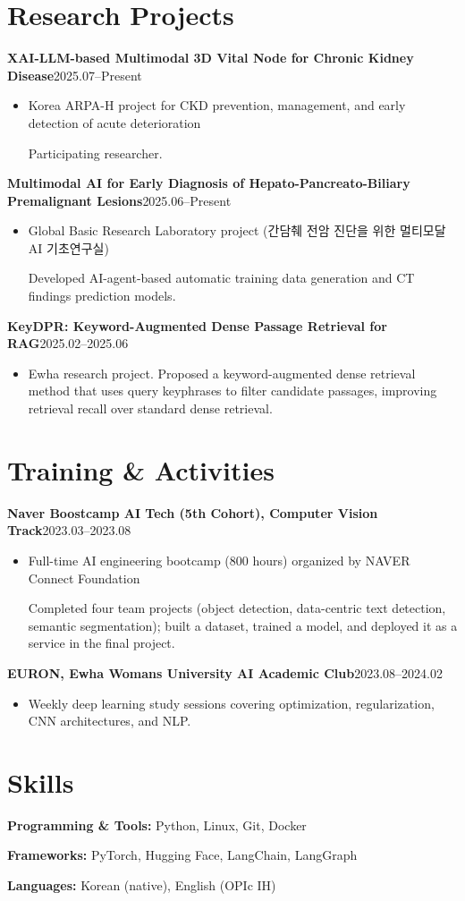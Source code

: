 \documentclass[10pt,a4paper]{article}
\newif\ifRemVS
\newcommand{\rvs}{\ifRemVS\vspace{-1.5ex}\fi\global\RemVSfalse}
\newcommand{\cventry}[3]{%
  \noindent\begin{minipage}{\linewidth}
    \rvs
    {\small\textbf{#1}\hfill #2\par}
    \begin{itemize}[topsep=2pt]\item #3\end{itemize}
  \end{minipage}\par}
\begin{document}
\section{Res\color{black}earch Projects}
\cventry{XAI-LLM-based Multimodal 3D Vital Node for Chronic Kidney Disease}{2025.07–Present}{%
  Korea ARPA-H project for CKD prevention, management, and early detection of acute deterioration\par
  Participating researcher.}
\medskip
\cventry{Multimodal AI for Early Diagnosis of Hepato-Pancreato-Biliary Premalignant Lesions}{2025.06–Present}{%
  Global Basic Research Laboratory project (간담췌 전암 진단을 위한 멀티모달 AI 기초연구실)\par
  Developed AI-agent-based automatic training data generation and CT findings prediction models.}
\medskip
\cventry{KeyDPR: Keyword-Augmented Dense Passage Retrieval for RAG}{2025.02–2025.06}{%
  Ewha research project. Proposed a keyword-augmented dense retrieval method that uses query keyphrases
  to filter candidate passages, improving retrieval recall over standard dense retrieval.}

\section{Tra\color{black}ining \& Activities}
\cventry{Naver Boostcamp AI Tech (5th Cohort), Computer Vision Track}{2023.03–2023.08}{%
  Full-time AI engineering bootcamp (800 hours) organized by NAVER Connect Foundation\par
  Completed four team projects (object detection, data-centric text detection, semantic segmentation);
  built a dataset, trained a model, and deployed it as a service in the final project.}
\medskip
\cventry{EURON, Ewha Womans University AI Academic Club}{2023.08–2024.02}{%
  Weekly deep learning study sessions covering optimization, regularization, CNN architectures, and NLP.}

\section{Ski\color{black}lls}
\begin{minipage}{\linewidth}
\textbf{Programming \& Tools:} Python, Linux, Git, Docker\par
\textbf{Frameworks:} PyTorch, Hugging Face, LangChain, LangGraph\par
\textbf{Languages:} Korean (native), English (OPIc IH)
\end{minipage}
\end{document}
